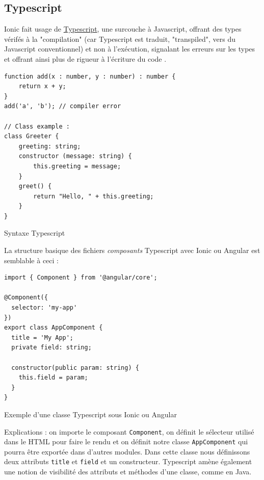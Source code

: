\documentclass[a4paper, 12pt]{article}
\newenvironment{code}{\captionsetup{type=listing}}{}
\begin{document}
\subsection{Typescript}
Ionic fait usage de \href{http://www.typescriptlang.org/}{Typescript}, une surcouche à Javascript, offrant des types
vérifés à la "compilation" (car Typescript est traduit, "transpiled", vers du Javascript conventionnel) et non à
l'exécution, signalant les erreurs sur les types et offrant ainsi plus de rigueur à l'écriture du code \cite{ref12}.
\begin{code}
    \begin{verbatim}
function add(x : number, y : number) : number {
    return x + y;
}
add('a', 'b'); // compiler error

// Class example :
class Greeter {
    greeting: string;
    constructor (message: string) {
        this.greeting = message;
    }
    greet() {
        return "Hello, " + this.greeting;
    }
}
    \end{verbatim}
    \caption{Syntaxe Typescript}
\end{code}
La structure basique des fichiers \textit{composants} Typescript avec Ionic ou Angular est semblable à ceci :
\\
\begin{code}
    \begin{verbatim}
import { Component } from '@angular/core';

@Component({
  selector: 'my-app'
})
export class AppComponent {
  title = 'My App';
  private field: string;

  constructor(public param: string) {
    this.field = param;
  }
}
    \end{verbatim}
    \caption{Exemple d'une classe Typescript sous Ionic ou Angular}
\end{code}
Explications : on importe le composant \texttt{Component}, on définit le sélecteur utilisé dans le HTML
pour faire le rendu et on définit notre classe \texttt{AppComponent} qui pourra être exportée dans
d'autres modules. Dans cette classe nous définissons deux attributs \texttt{title} et
\texttt{field} et un constructeur. Typescript amène également une notion de visibilité des attributs
et méthodes d'une classe, comme en Java.
\end{document}
